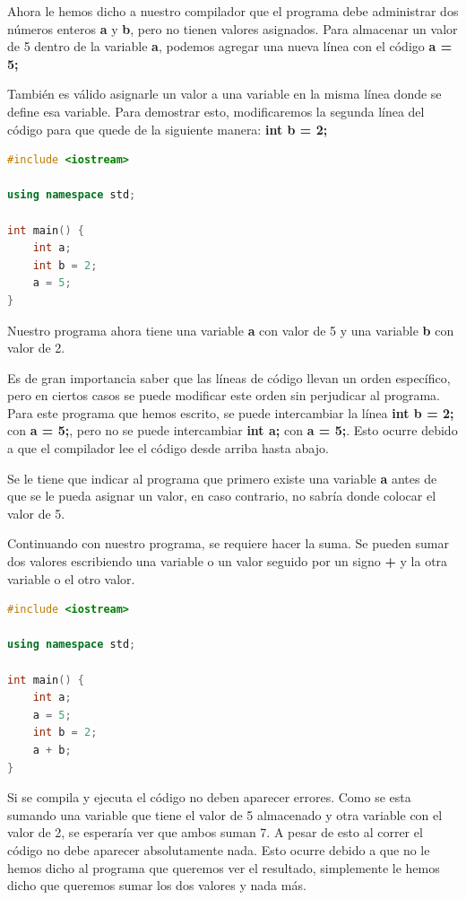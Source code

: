 \documentclass{article}
\begin{document}
Ahora le hemos dicho a nuestro compilador que el programa debe administrar dos números enteros \textbf{a} y \textbf{b}, pero no tienen valores asignados. Para almacenar un valor de 5 dentro de la variable \textbf{a}, podemos agregar una nueva línea con el código \textbf{a = 5;}

También es válido asignarle un valor a una variable en la misma línea donde se define esa variable. Para demostrar esto, modificaremos la segunda línea del código para que quede de la siguiente manera: \textbf{int b = 2;}

\begin{lstlisting}[language=C++, title=Guardando valores]
#include <iostream>

using namespace std;

int main() {
	int a;
	int b = 2;
	a = 5;
}
\end{lstlisting}

Nuestro programa ahora tiene una variable \textbf{a} con valor de 5 y una variable \textbf{b} con valor de 2.

Es de gran importancia saber que las líneas de código llevan un orden específico, pero en ciertos casos se puede modificar este orden sin perjudicar al programa. Para este programa que hemos escrito, se puede intercambiar la línea \textbf{int b = 2;} con \textbf{a = 5;}, pero no se puede intercambiar \textbf{int a;} con \textbf{a = 5;}. Esto ocurre debido a que el compilador lee el código desde arriba hasta abajo.

Se le tiene que indicar al programa que primero existe una variable \textbf{a} antes de que se le pueda asignar un valor, en caso contrario, no sabría donde colocar el valor de 5.

Continuando con nuestro programa, se requiere hacer la suma. Se pueden sumar dos valores escribiendo una variable o un valor seguido por un signo \textbf{+} y la otra variable o el otro valor.

\begin{lstlisting}[language=C++, title=Guardando valores]
#include <iostream>

using namespace std;

int main() {
	int a;
	a = 5;
	int b = 2;
	a + b;
}
\end{lstlisting}

Si se compila y ejecuta el código no deben aparecer errores. Como se esta sumando una variable que tiene el valor de 5 almacenado y otra variable con el valor de 2, se esperaría ver que ambos suman 7. A pesar de esto al correr el código no debe aparecer absolutamente nada. Esto ocurre debido a que no le hemos dicho al programa que queremos ver el resultado, simplemente le hemos dicho que queremos sumar los dos valores y nada más.
\end{document}
